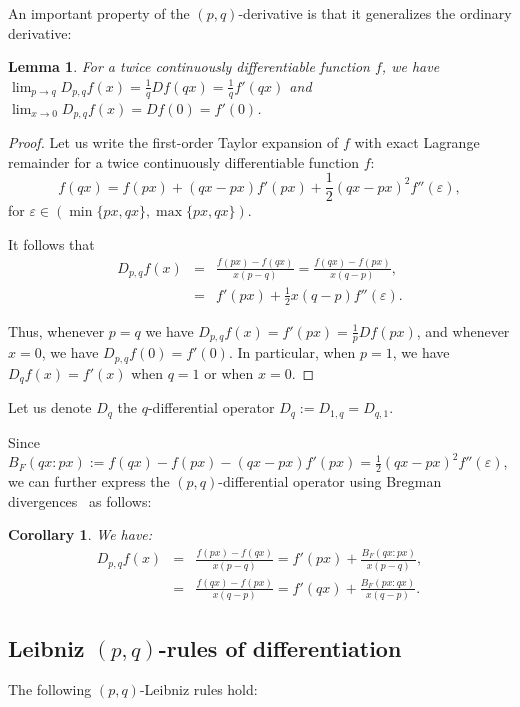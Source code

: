 \documentclass{article}
\def\eqdef{:=}
\newtheorem{lemma}[theorem]{Lemma}
\newtheorem{corollary}[theorem]{Corollary}
\begin{document}
An important property of the $(p,q)$-derivative is that it generalizes the ordinary derivative:
\begin{lemma}
For a twice continuously differentiable function $f$, 
we have $\lim_{p\rightarrow q} D_{p,q} f(x)= \frac{1}{q} D f(qx)=\frac{1}{q} f'(qx)$ and $\lim_{x\rightarrow 0} D_{p,q} f(x)=D f(0)=f'(0)$.
\end{lemma}


\begin{proof}
Let us write the first-order Taylor expansion of $f$ with exact Lagrange remainder for a twice continuously differentiable function $f$:
$$
f(qx)=f(px)+(qx-px)f'(px)+\frac{1}{2}(qx-px)^2f''(\varepsilon),
$$
for $\varepsilon\in (\min\{px,qx\}, \max\{px,qx\})$.

It follows that
\begin{eqnarray}
D_{p,q} f(x) &=& \frac{f(px)-f(qx)}{x(p-q)} = \frac{f(qx)-f(px)}{x(q-p)},\\
&=& f'(px)+\frac{1}{2}x(q-p)f''(\varepsilon).
\end{eqnarray}

Thus, whenever $p=q$ we have $D_{p,q} f(x)=f'(px)= \frac{1}{p} D f(px)$, 
and whenever $x=0$, we have $D_{p,q} f(0)=f'(0)$.
In particular, when $p=1$, we have $D_{q} f(x)=f'(x)$ when $q=1$ or when $x=0$. 
\end{proof}

Let us denote $D_q$ the $q$-differential operator $D_q \eqdef D_{1,q}=D_{q,1}$.






Since $B_F(qx:px)\eqdef f(qx)-f(px)-(qx-px)f'(px)=\frac{1}{2}(qx-px)^2f''(\varepsilon)$, 
we can further express the $(p,q)$-differential operator using Bregman divergences~\cite{BD-2005} as follows:

\begin{corollary}
We have:
\begin{eqnarray*}
D_{p,q} f(x)&=&\frac{f(px)-f(qx)}{x(p-q)}=f'(px)+\frac{B_F(qx:px)}{x(p-q)},\\
&=& \frac{f(qx)-f(px)}{x(q-p)}=f'(qx)+\frac{B_F(px:qx)}{x(q-p)}.
\end{eqnarray*}
\end{corollary}



\subsection{Leibniz $(p,q)$-rules of differentiation}
The following $(p,q)$-Leibniz rules hold:
\end{document}

